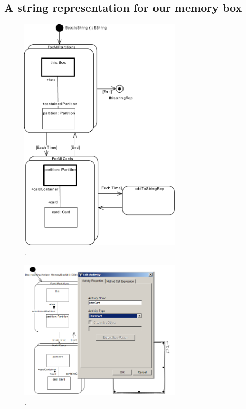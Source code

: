 \subsection{A string representation for our memory box}
\begin{figure}[htp]
\begin{center}
  \includegraphics[width=0.7\textwidth]{pics/sdmBilder/toString/sdm72}
  \caption{.}  
  \label{fig:sdm_invert_}
\end{center}
\end{figure}

\begin{figure}[htp]
\begin{center}
  \includegraphics[width=0.7\textwidth]{pics/sdmBilder/toString/sdm73}
  \caption{.}  
  \label{fig:sdm_invert_}
\end{center}
\end{figure}

